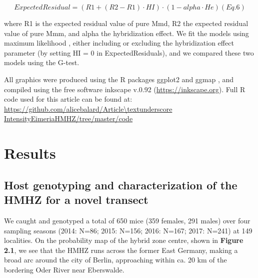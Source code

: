 \[ExpectedResidual = (R1 + (R2 − R1) · HI) · (1 − alpha · He) (Eq. 6) \]

where R1 is the expected residual value of pure Mmd, R2 the expected residual value of pure Mmm, and alpha the hybridization effect. We fit the models using maximum likelihood \parencite[using the R package mle2;][]{bolker_bbmle_2017}, either including or excluding the hybridization effect parameter (by setting HI = 0 in ExpectedResiduals), and we compared these two models using the G-test. 
\par All graphics were produced using the R packages ggplot2 \citep{wickham_ggplot2_2016} and ggmap \citep{kahle_ggmap_2013}, and compiled using the free software inkscape v.0.92 (\url{https://inkscape.org}). Full R code used for this article can be found at:	 \url{https://github.com/alicebalard/Article\textunderscore IntensityEimeriaHMHZ/tree/master/code}

\section{Results}
\subsection{Host genotyping and characterization of the HMHZ for a novel transect}
We caught and genotyped a total of 650 mice (359 females, 291 males) over four sampling seasons (2014: N=86; 2015: N=156; 2016: N=167; 2017: N=241) at 149 localities. On the probability map of the hybrid zone centre, shown in \textbf{Figure 2.1}, we see that the HMHZ runs across the former East Germany, making a broad arc around the city of Berlin, approaching within ca. 20 km of the bordering Oder River near Eberswalde. 

